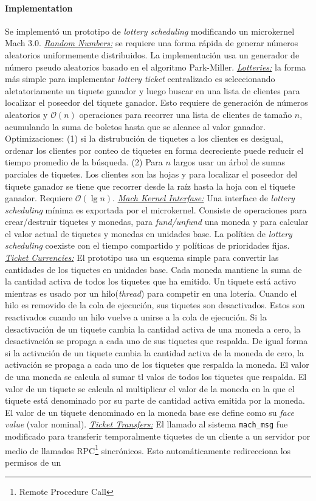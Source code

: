 \paragraph{\textnormal{\textbf{Implementation}}}
Se implementó un prototipo de \textit{lottery scheduling} modificando un microkernel Mach 3.0. \underline{\textit{Random Numbers:}} se requiere una forma rápida de generar números aleatorios uniformemente distribuidos. La implementación usa un generador de número pseudo aleatorios basado en el algoritmo Park-Miller. \underline{\textit{Lotteries:}} la forma más simple para implementar \textit{lottery ticket} centralizado es seleccionando aletatoriamente un tiquete ganador y luego buscar en una lista de clientes para localizar el poseedor del tiquete ganador. Esto requiere de generación de números aleatorios y $\mathcal{O}(n)$ operaciones para recorrer una lista de clientes de tamaño $n$, acumulando la suma de boletos hasta que se alcance al valor ganador. Optimizaciones: (1) si la distrubución de tiquetes a los clientes es desigual, ordenar los clientes por conteo de tiquetes en forma decreciente puede reducir el tiempo promedio de la búsqueda. (2) Para $n$ largos usar un árbol de sumas parciales de tiquetes. Los clientes son las hojas y para localizar el poseedor del tiquete ganador se tiene que recorrer desde la raíz hasta la hoja con el tiquete ganador. Requiere $\mathcal{O}({\lg n})$. \underline{\textit{Mach Kernel Interfase:}} Una interface de \textit{lottery scheduling} mínima es exportada por el microkernel. Consiste de operaciones para crear/destruir tiquetes y monedas, para \textit{fund/unfund} una moneda y para calcular el valor actual de tiquetes y monedas en unidades base. La política de \textit{lottery scheduling} coexiste con el tiempo compartido y políticas de prioridades fijas. \underline{\textit{Ticket Currencies:}} El prototipo usa un esquema simple para convertir las cantidades de los tiquetes en unidades base. Cada moneda mantiene la suma de la cantidad activa de todos los tiquetes que ha emitido. Un tiquete está activo mientras es usado por un hilo(\textit{thread}) para competir en una lotería. Cuando el hilo es removido de la cola de ejecución, sus tiquetes son desactivados. Estos son reactivados cuando un hilo vuelve a unirse a la cola de ejecución. Si la desactivación de un tiquete cambia la cantidad activa de una moneda a cero, la desactivación se propaga a cada uno de sus tiquetes que respalda. De igual forma si la activación de un tiquete cambia la cantidad activa de la moneda de cero, la activación se propaga a cada uno de los tiquetes que respalda la moneda. El valor de una moneda se calcula al sumar tl valos de todos los tiquetes que respalda. El valor de un tiquete se calcula al multiplicar el valor de la moneda en la que el tiquete está denominado por su parte de cantidad activa emitida por la moneda. El valor de un tiquete denominado en la moneda base ese define como su \emph{face value} (valor nominal). \underline{\textit{Ticket Transfers:}} El llamado al sistema \texttt{mach\_msg} fue modificado para transferir temporalmente tiquetes de un cliente a un servidor por medio de llamados RPC\footnote{Remote Procedure Call} sincrónicos. Esto automáticamente redirecciona los permisos de un 